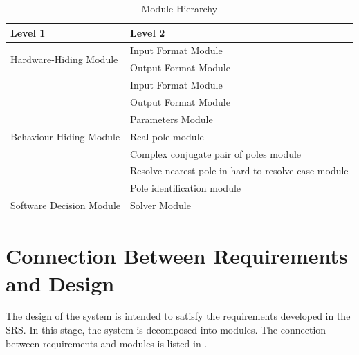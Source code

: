 \documentclass[12pt, titlepage]{article}
\begin{document}
\begin{table}[h!]
\centering
\begin{tabular}{p{} p{}}
\toprule
\textbf{Level 1} & \textbf{Level 2}\\
\midrule

\multirow{2}{0.3\textwidth}{Hardware-Hiding Module}
  & Input Format Module\\
  & Output Format Module \\

\midrule

\multirow{7}{0.3\textwidth}{Behaviour-Hiding Module}
  & Input Format Module\\
  & Output Format Module \\
  & Parameters Module\\
  & Real pole module\\
  & Complex conjugate pair of poles module\\ 
  & Resolve nearest pole in hard to resolve case module\\
  & Pole identification module\\
\midrule

{Software Decision Module} & Solver Module\\
\bottomrule

\end{tabular}
\caption{Module Hierarchy}
\label{tb:module}
\end{table}

\section{Connection Between Requirements and Design} \label{SecConnection}

The design of the system is intended to satisfy the requirements developed in
the SRS. In this stage, the system is decomposed into modules. The connection
between requirements and modules is listed in .

\end{document}
